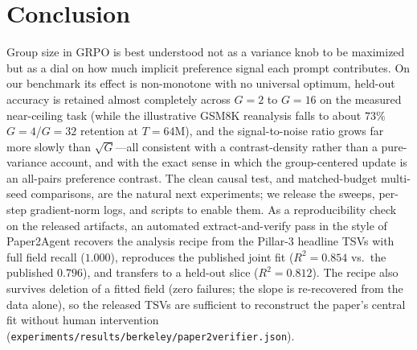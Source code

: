\section{Conclusion}
\label{sec:p3-conclusion}
Group size in GRPO is best understood not as a variance knob to be maximized but as
a dial on how much implicit preference signal each prompt contributes. On our
benchmark its effect is non-monotone with no universal optimum, held-out
accuracy is retained almost completely across $G{=}2$ to $G{=}16$ on the
measured near-ceiling task (while the illustrative GSM8K reanalysis falls to
about $73\%$ $G{=}4$/$G{=}32$ retention at $T{=}64$M), and the signal-to-noise ratio grows
far more slowly than $\sqrt{G}$---all consistent with a contrast-density rather than
a pure-variance account, and with the exact sense in which the group-centered update
is an all-pairs preference contrast. The clean causal test, and matched-budget
multi-seed comparisons, are the natural next experiments; we release the sweeps,
per-step gradient-norm logs, and scripts to enable them. As a reproducibility
check on the released artifacts, an automated extract-and-verify pass in the
style of Paper2Agent \citep{miao2025paper2agent} recovers the analysis recipe
from the Pillar-3 headline TSVs with full field recall ($1.000$), reproduces
the published joint fit ($R^2{=}0.854$ vs.\ the published $0.796$), and
transfers to a held-out slice ($R^2{=}0.812$). The recipe also survives
deletion of a fitted field (zero failures; the slope is re-recovered from the
data alone), so the released TSVs are sufficient to reconstruct the paper's
central fit without human intervention
(\texttt{experiments/results/berkeley/paper2verifier.json}).
